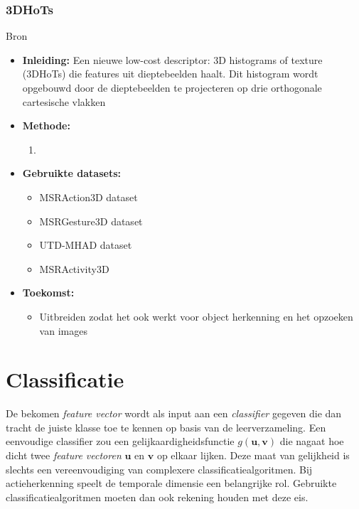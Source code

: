 \subsection{3DHoTs}
 Bron \cite{Chen2017}
\begin{itemize}
	\item \textbf{Inleiding:} Een nieuwe low-cost descriptor: 3D histograms of texture (3DHoTs) die features uit dieptebeelden haalt. Dit histogram wordt opgebouwd door de dieptebeelden te projecteren op drie orthogonale cartesische vlakken
	\item \textbf{Methode:} 
	\begin{enumerate}
		\item
	\end{enumerate}
	\item \textbf{Gebruikte datasets:}
	\begin{itemize}
		\item MSRAction3D dataset
		\item MSRGesture3D dataset
		\item UTD-MHAD dataset
		\item MSRActivity3D
	\end{itemize}
	\item \textbf{Toekomst:}
	\begin{itemize}
		\item Uitbreiden zodat het ook werkt voor object herkenning en het opzoeken van images
	\end{itemize}
\end{itemize}



\chapter{Classificatie}
\label{ch:classificatie}
 De bekomen \textit{feature vector} wordt als input aan een \textit{classifier} gegeven die dan tracht de juiste klasse toe te kennen op basis van de leerverzameling. Een eenvoudige classifier zou een gelijkaardigheidsfunctie $g(\textbf{u}, \textbf{v})$ die nagaat hoe dicht twee \textit{feature vectoren} $\textbf{u}$ en $\textbf{v}$ op elkaar lijken. Deze maat van gelijkheid is slechts een vereenvoudiging van complexere classificatiealgoritmen. Bij actieherkenning speelt de temporale dimensie een belangrijke rol. Gebruikte classificatiealgoritmen moeten dan ook rekening houden met deze eis. 


